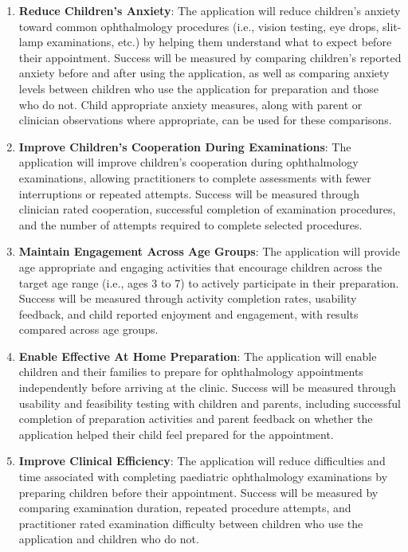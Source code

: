 \documentclass{article}
\begin{document}
\begin{enumerate}
    \item \textbf{Reduce Children's Anxiety}: 
    The application will reduce children's anxiety toward common ophthalmology procedures 
    (i.e., vision testing, eye drops, slit-lamp examinations, etc.) by helping them understand 
    what to expect before their appointment. Success will be measured by comparing children's 
    reported anxiety before and after using the application, as well as comparing anxiety 
    levels between children who use the application for preparation and those who do not. 
    Child appropriate anxiety measures, along with parent or clinician observations where 
    appropriate, can be used for these comparisons.

    \item \textbf{Improve Children's Cooperation During Examinations}: 
    The application will improve children's cooperation during ophthalmology examinations, 
    allowing practitioners to complete assessments with fewer interruptions or repeated 
    attempts. Success will be measured through clinician rated cooperation, successful 
    completion of examination procedures, and the number of attempts required to complete 
    selected procedures.

    \item \textbf{Maintain Engagement Across Age Groups}: 
    The application will provide age appropriate and engaging activities that encourage 
    children across the target age range (i.e., ages 3 to 7) to actively participate in 
    their preparation. Success will be measured through activity completion rates, usability 
    feedback, and child reported enjoyment and engagement, with results compared across 
    age groups.

    \item \textbf{Enable Effective At Home Preparation}: 
    The application will enable children and their families to prepare for ophthalmology 
    appointments independently before arriving at the clinic. Success will be measured 
    through usability and feasibility testing with children and parents, including successful 
    completion of preparation activities and parent feedback on whether the application 
    helped their child feel prepared for the appointment.

    \item \textbf{Improve Clinical Efficiency}: 
    The application will reduce difficulties and time associated with completing paediatric 
    ophthalmology examinations by preparing children before their appointment. Success will 
    be measured by comparing examination duration, repeated procedure attempts, and 
    practitioner rated examination difficulty between children who use the application and 
    children who do not.
\end{enumerate}
\end{document}
